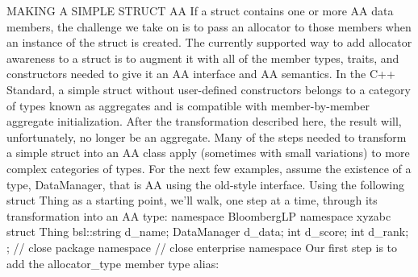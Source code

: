 MAKING A SIMPLE STRUCT AA
If a struct contains one or more AA data members, the challenge we take on is to pass an allocator to those members when an instance of the struct is created. The currently supported way to add allocator awareness to a struct is to augment it with all of the member types, traits, and constructors needed to give it an AA interface and AA semantics. In the C++ Standard, a simple struct without user-defined constructors belongs to a category of types known as aggregates and is compatible with member-by-member aggregate initialization.  After the transformation described here, the result will, unfortunately, no longer be an aggregate.  Many of the steps needed to transform a simple struct into an AA class apply (sometimes with small variations) to more complex categories of types.
For the next few examples, assume the existence of a type, DataManager, that is AA using the old-style interface. Using the following struct Thing as a starting point, we’ll walk, one step at a time, through its transformation into an AA type:
namespace BloombergLP {
namespace xyzabc {
struct Thing {
    bsl::string d_name;
    DataManager d_data;
    int         d_score;
    int         d_rank;
};
} // close package namespace
} // close enterprise namespace
Our first step is to add the allocator_type member type alias: 
